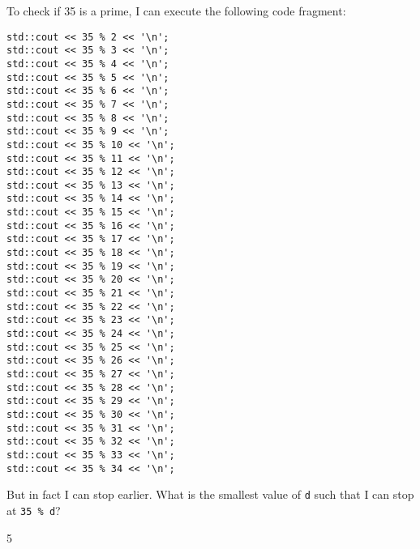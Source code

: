 \newpage
\nextq
To check if 35 is a prime, I can execute the following
code fragment:
\begin{Verbatim}[frame=single,fontsize=\footnotesize]
std::cout << 35 % 2 << '\n';
std::cout << 35 % 3 << '\n';
std::cout << 35 % 4 << '\n';
std::cout << 35 % 5 << '\n';
std::cout << 35 % 6 << '\n';
std::cout << 35 % 7 << '\n';
std::cout << 35 % 8 << '\n';
std::cout << 35 % 9 << '\n';
std::cout << 35 % 10 << '\n';
std::cout << 35 % 11 << '\n';
std::cout << 35 % 12 << '\n';
std::cout << 35 % 13 << '\n';
std::cout << 35 % 14 << '\n';
std::cout << 35 % 15 << '\n';
std::cout << 35 % 16 << '\n';
std::cout << 35 % 17 << '\n';
std::cout << 35 % 18 << '\n';
std::cout << 35 % 19 << '\n';
std::cout << 35 % 20 << '\n';
std::cout << 35 % 21 << '\n';
std::cout << 35 % 22 << '\n';
std::cout << 35 % 23 << '\n';
std::cout << 35 % 24 << '\n';
std::cout << 35 % 25 << '\n';
std::cout << 35 % 26 << '\n';
std::cout << 35 % 27 << '\n';
std::cout << 35 % 28 << '\n';
std::cout << 35 % 29 << '\n';
std::cout << 35 % 30 << '\n';
std::cout << 35 % 31 << '\n';
std::cout << 35 % 32 << '\n';
std::cout << 35 % 33 << '\n';
std::cout << 35 % 34 << '\n';
\end{Verbatim}
But in fact I can stop earlier.
What is the smallest value of \verb!d! such that
I can stop at \verb!35 % d!?
\\
\ANSWER
\begin{answercode}
5
\end{answercode}


